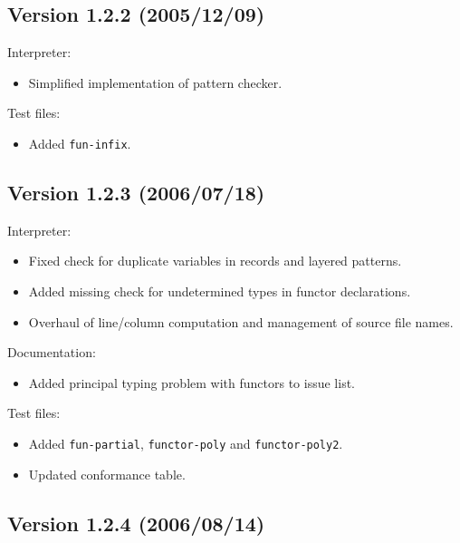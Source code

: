 \documentclass[twoside,titlepage]{article}
\begin{document}
\begin{appendix}
\subsection*{Version 1.2.2 (2005/12/09)}

Interpreter:
\begin{itemize}[nolistsep]
\item Simplified implementation of pattern checker.
\end{itemize}

Test files:
\begin{itemize}[nolistsep]
\item Added {\tt fun-infix}.
\end{itemize}

\subsection*{Version 1.2.3 (2006/07/18)}

Interpreter:
\begin{itemize}[nolistsep]
\item Fixed check for duplicate variables in records and layered patterns.
\item Added missing check for undetermined types in functor declarations.
\item Overhaul of line/column computation and management of source file names.
\end{itemize}

Documentation:
\begin{itemize}[nolistsep]
\item Added principal typing problem with functors to issue list.
\end{itemize}

Test files:
\begin{itemize}[nolistsep]
\item Added {\tt fun-partial}, {\tt functor-poly} and {\tt functor-poly2}.
\item Updated conformance table.
\end{itemize}

\subsection*{Version 1.2.4 (2006/08/14)}


\end{appendix}
\end{document}

